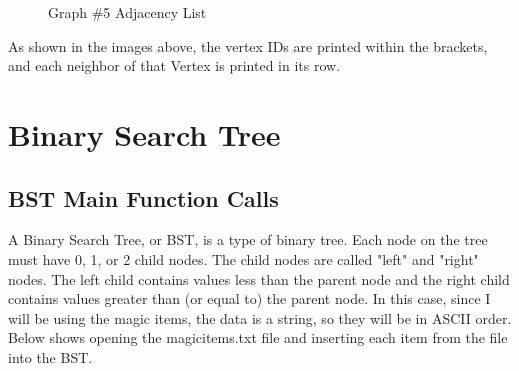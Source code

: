 \documentclass[letterpaper, 10pt]{article}
\begin{document}
\begin{figure}[H] 
    \centering 
    \caption{Graph \#5 Adjacency List}
    \label{fig:figure2.26}
\end{figure}

\noindent
As shown in the images above, the vertex IDs are printed within the brackets, and each neighbor of that Vertex is printed in its row.

\section{Binary Search Tree}
\setcounter{figure}{0} %

\subsection{BST Main Function Calls}
\noindent
A Binary Search Tree, or BST, is a type of binary tree. Each node on the tree must have 0, 1, or 2 child nodes. The child nodes are called "left" and "right" nodes. The left child contains values less than the parent node and the right child contains values greater than (or equal to) the parent node. In this case, since I will be using the magic items, the data is a string, so they will be in ASCII order. Below shows opening the magicitems.txt file and inserting each item from the file into the BST. 

\begin{figure}[H]
  \centering
   
  \label{fig:figure3.1-part1}
\end{figure}

\vspace{-3em}
\end{document}
